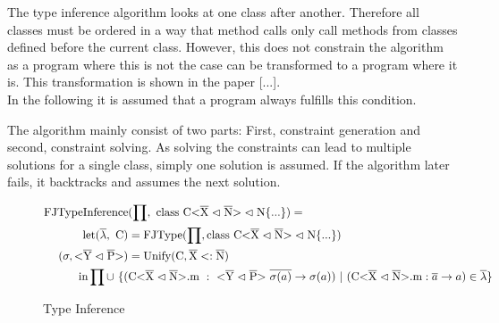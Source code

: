 The type inference algorithm looks at one class after another. Therefore all classes must be ordered in a way that method calls only call methods from classes defined before the current class.
However, this does not constrain the algorithm as a program where this is not the case can be transformed to a program where it is.
This transformation is shown in the paper [...].
\\
In the following it is assumed that a program always fulfills this condition.

The algorithm mainly consist of two parts:
First, constraint generation and second, constraint solving.
As solving the constraints can lead to multiple solutions for a single class, simply one solution is assumed. If the algorithm later fails, it backtracks and assumes the next solution.

\begin{figure}[H]
    \begin{align*}
        \text{FJTypeInference}&(\prod, \ \classheader \{ ... \}) = \\
        \text{let} (\overline{\lambda}, \ \text{C}) &= \text{FJType}(\prod, \classheader \{ ... \}) \\
        (\sigma, \yp) &= \text{Unify}(\text{C}, \overline{\text{X}} <: \overline{\text{N}}) \\
        \text{in} \prod \cup \ \{( & \cm \ : \ \yp \ \oto{\sigma(a)}) \ | \ (\cm : \oto{a} ) \in \overline{\lambda} \}
    \end{align*}
    \caption{Type Inference}
    \label{type_inference}
\end{figure}
